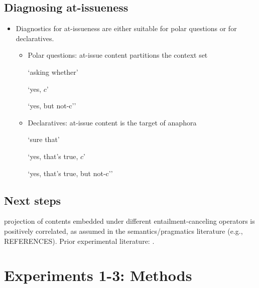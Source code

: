 \documentclass[11pt,fleqn]{article}
\newcommand{\6}{\mbox{$[\hspace*{-.6mm}[$}}
\newcommand{\9}{\mbox{$]\hspace*{-.6mm}]$}}
\begin{document}
\subsection{Diagnosing at-issueness}

\begin{itemize}

\item Diagnostics for at-issueness are either suitable for polar questions or for declaratives.

\begin{itemize}

\item Polar questions: at-issue content partitions the context set

`asking whether'

`yes, $c$'

`yes, but not-c''

\item Declaratives: at-issue content is the target of anaphora

`sure that'

`yes, that's true, $c$'

`yes, that's true, but not-c''

\end{itemize}

\end{itemize}

\subsection{Next steps}

projection of contents embedded under different entailment-canceling operators is positively correlated, as assumed in the semantics/pragmatics literature (e.g., REFERENCES). Prior experimental literature: \citealt{smith-hall11,smith-hall-cls,demarneffe-etal-sub23}. 

\newpage

\section{Experiments 1-3: Methods}\label{s2}
\end{document}
